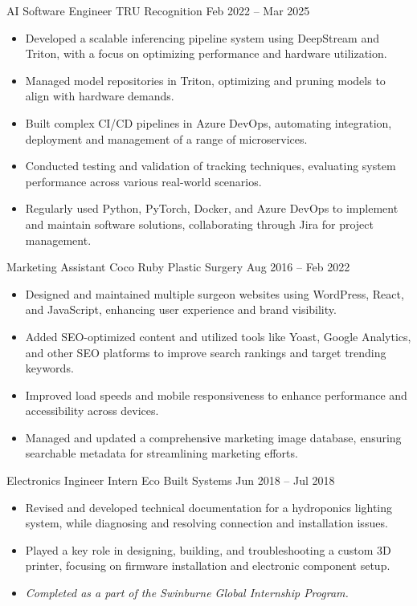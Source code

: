 \documentclass[9pt]{extarticle}
\begin{document}
\cvbreak

\begin{minipage}[t]{\textwidth}
	\vspace{-\baselineskip}

	\cvexperience
		{AI Software Engineer}
		{TRU Recognition}
		{Feb 2022 -- Mar 2025}
		{
			\begin{itemize}
				\item Developed a scalable inferencing pipeline system using DeepStream and Triton, with a focus on optimizing performance and hardware utilization.
				\item Managed model repositories in Triton, optimizing and pruning models to align with hardware demands.
				\item Built complex CI/CD pipelines in Azure DevOps, automating integration, deployment and management of a range of microservices.
				\item Conducted testing and validation of tracking techniques, evaluating system performance across various real-world scenarios.
				\item Regularly used Python, PyTorch, Docker, and Azure DevOps to implement and maintain software solutions, collaborating through Jira for project management.
			\end{itemize}
		}

	\cvexperience
		{Marketing Assistant}
		{Coco Ruby Plastic Surgery}
		{Aug 2016 -- Feb 2022}
		{
			\begin{itemize}
				\item Designed and maintained multiple surgeon websites using WordPress, React, and JavaScript, enhancing user experience and brand visibility.
				\item Added SEO-optimized content and utilized tools like Yoast, Google Analytics, and other SEO platforms to improve search rankings and target trending keywords.
				\item Improved load speeds and mobile responsiveness to enhance performance and accessibility across devices.
				\item Managed and updated a comprehensive marketing image database, ensuring searchable metadata for streamlining marketing efforts.
			\end{itemize}
		}

	\cvexperience
		{Electronics Ingineer Intern}
		{Eco Built Systems}
		{Jun 2018 -- Jul 2018}
		{
			\begin{itemize}
				\item Revised and developed technical documentation for a hydroponics lighting system, while diagnosing and resolving connection and installation issues.
				\item Played a key role in designing, building, and troubleshooting a custom 3D printer, focusing on firmware installation and electronic component setup.
				\item \textit{Completed as a part of the Swinburne Global Internship Program.}
			\end{itemize}
		}
\end{minipage}
\end{document}
